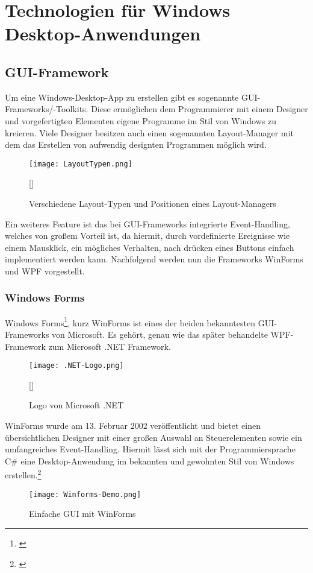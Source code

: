 \chapter{Technologien für Windows Desktop-Anwendungen}
\label{chap:TechnologienfürWindowsDesktop-Anwendungen}

\section{GUI-Framework}

Um eine Windows-Desktop-App zu erstellen gibt es sogenannte GUI-Frameworks/-Toolkits. Diese ermöglichen dem Programmierer mit einem Designer und vorgefertigten Elementen eigene Programme im Stil von Windows zu kreieren. 
Viele Designer besitzen auch einen sogenannten Layout-Manager mit dem das Erstellen von aufwendig designten Programmen möglich wird. 
\\
\begin{figure}[H]
    \centering
    \texttt{[image: LayoutTypen.png]}
    \caption[Verschiedene Layout-Typen und Positionen eines Layout-Managers]{Verschiedene Layout-Typen und Positionen eines Layout-Managers}[\cite{Layout}]
\end{figure}
\noindent 
Ein weiteres Feature ist das bei GUI-Frameworks integrierte Event-Handling, welches von großem Vorteil ist, da hiermit, durch vordefinierte Ereignisse wie einem Mausklick, ein mögliches Verhalten, nach drücken eines Buttons einfach implementiert werden kann.
Nachfolgend werden nun die Frameworks WinForms und WPF vorgestellt.

\subsection{Windows Forms}

Windows Forms\footnote[1]{\cite[Vgl.][]{WindowsForms1}}, kurz WinForms ist eines der beiden bekanntesten GUI-Frameworks von Microsoft. Es gehört, genau wie das später behandelte WPF-Framework zum Microsoft 
.NET Framework.
\\
\begin{figure}[H]
    \centering
    \texttt{[image: .NET-Logo.png]}
    \caption[Logo von Microsoft .NET]{Logo von Microsoft .NET}[\cite{DotNet}]
\end{figure}
\noindent
WinForms wurde am 13. Februar 2002 veröffentlicht und bietet einen übersichtlichen Designer mit einer großen Auswahl an Steuerelementen sowie ein umfangreiches Event-Handling. Hiermit lässt sich mit der Programmiersprache C\# eine Desktop-Anwendung im bekannten und gewohnten Stil von Windows erstellen.\footnote[2]{\cite[Vgl.][]{WindowsForms2}}
\\
\begin{figure}[H]
    \centering
    \texttt{[image: Winforms-Demo.png]}
    \caption[Einfache GUI mit WinForms]{Einfache GUI mit WinForms} 
\end{figure}

